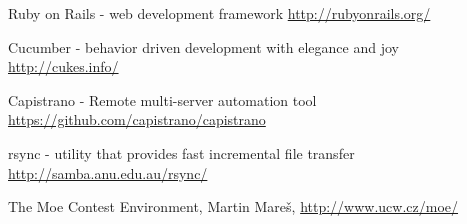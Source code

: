 \documentclass[a4paper,12pt]{article}
\begin{document}
\begin{thebibliography}{99}
      Ruby on Rails - web development framework \url{http://rubyonrails.org/}
      
      Cucumber - behavior driven development with elegance and joy \url{http://cukes.info/}
    
      Capistrano - Remote multi-server automation tool \url{https://github.com/capistrano/capistrano}
      
      rsync - utility that provides fast incremental file transfer \url{http://samba.anu.edu.au/rsync/}
      
      The Moe Contest Environment, Martin Mareš, \url{http://www.ucw.cz/moe/}
  \end{thebibliography}
\end{document}

